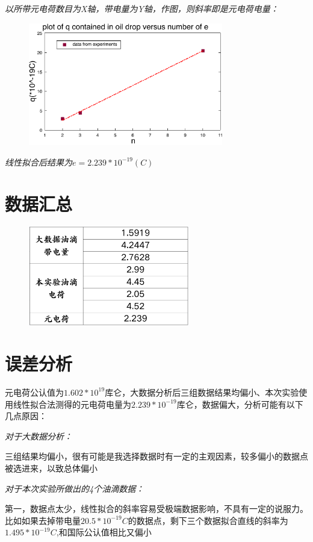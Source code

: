 \documentclass[UTF8]{ctexart}
\begin{document}
        \emph{以所带元电荷数目为X轴，带电量为Y轴，作图，则斜率即是元电荷电量：}
        \begin{figure}[ht]
            \centering 
            \includegraphics[width=8.5cm]{www.pdf}
        \end{figure} 

        \emph{线性拟合后结果为$e=2.239*10^{-19}(C)$}

    \section{数据汇总}
    \begin{figure}[ht]
        \centering 
        \includegraphics[width=7cm]{ddd.png}
    \end{figure} 
    \section{误差分析}
    元电荷公认值为$1.602*10^{19}$库仑，大数据分析后三组数据结果均偏小、本次实验使用线性拟合法测得的元电荷电量为$2.239*10^{-19}$库仑，数据偏大，分析可能有以下几点原因：

    \emph{对于大数据分析：}
    
    三组结果均偏小，很有可能是我选择数据时有一定的主观因素，较多偏小的数据点被选进来，以致总体偏小

    \emph{对于本次实验所做出的4个油滴数据：}
    
    第一，数据点太少，线性拟合的斜率容易受极端数据影响，不具有一定的说服力。比如如果去掉带电量$20.5*10^{-19}C$的数据点，剩下三个数据拟合直线的斜率为$1.495*10^{-19}C$,和国际公认值相比又偏小
\end{document}
